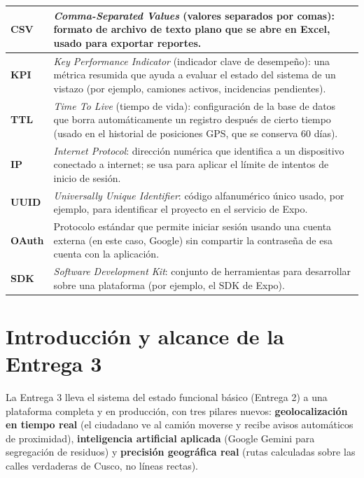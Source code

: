 \documentclass[11pt,a4paper]{article}
\begin{document}
\begin{longtable}{|p{3.2cm}|p{11cm}|}
\hline
\textbf{CSV} & \textit{Comma-Separated Values} (valores separados por comas): formato de archivo de texto plano que se abre en Excel, usado para exportar reportes. \\
\hline
\textbf{KPI} & \textit{Key Performance Indicator} (indicador clave de desempeño): una métrica resumida que ayuda a evaluar el estado del sistema de un vistazo (por ejemplo, camiones activos, incidencias pendientes). \\
\hline
\textbf{TTL} & \textit{Time To Live} (tiempo de vida): configuración de la base de datos que borra automáticamente un registro después de cierto tiempo (usado en el historial de posiciones GPS, que se conserva 60 días). \\
\hline
\textbf{IP} & \textit{Internet Protocol}: dirección numérica que identifica a un dispositivo conectado a internet; se usa para aplicar el límite de intentos de inicio de sesión. \\
\hline
\textbf{UUID} & \textit{Universally Unique Identifier}: código alfanumérico único usado, por ejemplo, para identificar el proyecto en el servicio de Expo. \\
\hline
\textbf{OAuth} & Protocolo estándar que permite iniciar sesión usando una cuenta externa (en este caso, Google) sin compartir la contraseña de esa cuenta con la aplicación. \\
\hline
\textbf{SDK} & \textit{Software Development Kit}: conjunto de herramientas para desarrollar sobre una plataforma (por ejemplo, el SDK de Expo). \\
\hline
\end{longtable}

\section{Introducción y alcance de la Entrega 3}

La Entrega 3 lleva el sistema del estado funcional básico (Entrega 2) a una plataforma completa y en producción, con tres pilares nuevos: \textbf{geolocalización en tiempo real} (el ciudadano ve al camión moverse y recibe avisos automáticos de proximidad), \textbf{inteligencia artificial aplicada} (Google Gemini para segregación de residuos) y \textbf{precisión geográfica real} (rutas calculadas sobre las calles verdaderas de Cusco, no líneas rectas).
\end{document}
